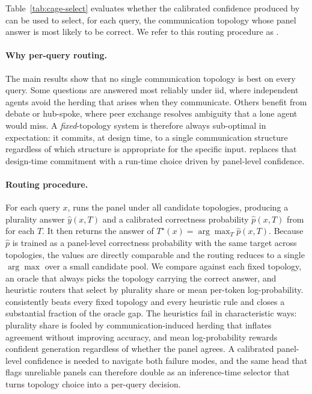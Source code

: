 Table~\ref{tab:cage-select} evaluates whether the calibrated
confidence produced by \methodname{} can be used to select, for each query, the communication topology whose panel answer is most likely to be correct. We refer to this routing procedure as \select{}.

\paragraph{Why per-query routing.}
The main results show that no single communication topology is best on every query. Some questions are answered most reliably under iid, where independent agents avoid the herding that arises when they communicate. Others benefit from debate or hub-spoke, where peer exchange resolves ambiguity that a lone agent would miss. A \emph{fixed}-topology system is therefore always sub-optimal in
expectation: it commits, at design time, to a single communication structure regardless of which structure is appropriate for the specific input. \select{} replaces that design-time commitment with a run-time choice driven by panel-level confidence.

\paragraph{Routing procedure.}
For each query $x$, \select{} runs the panel under all candidate topologies, producing a plurality answer $\hat{y}(x,T)$ and a calibrated correctness probability $\hat{p}(x,T)$ from \methodname{} for each $T$. It then returns the answer of $T^{\star}(x) = \arg\max_{T} \hat{p}(x,T)$. Because $\hat{p}$ is trained as a panel-level correctness probability with the same target across topologies, the values are directly comparable and the routing reduces to a single $\arg\max$ over a small candidate pool. We compare \select{} against each fixed topology, an oracle that always picks the topology carrying the correct answer, and heuristic routers that select by plurality share or mean per-token log-probability. \select{} consistently beats every fixed topology
and every heuristic rule and closes a substantial fraction of the oracle gap. The heuristics fail in characteristic ways: plurality share is fooled by communication-induced herding that inflates agreement without improving accuracy, and mean log-probability rewards confident generation regardless of whether the panel agrees. A calibrated panel-level confidence is needed to navigate both
failure modes, and the same head that flags unreliable panels can therefore double as an inference-time selector that turns topology choice into a per-query decision.



